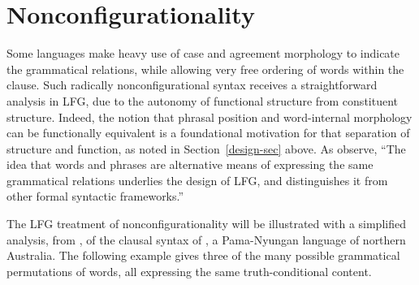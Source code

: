 %

\section{Nonconfigurationality}
\label{nonconfig-sec}
Some languages make heavy use of case and agreement morphology to indicate the grammatical relations, while allowing very free ordering of words within the clause.  Such radically nonconfigurational syntax receives a straightforward analysis in LFG, due to the autonomy of functional structure from constituent structure.  Indeed, the notion that phrasal position and word-internal morphology can be functionally equivalent is a foundational motivation for that separation of structure and function, as noted in Section~\ref{design-sec} above.  As \citet[5]{BATW2016a} observe, ``The idea that words and phrases are alternative means of expressing the
same grammatical relations underlies the design of LFG, and distinguishes it from other formal syntactic frameworks.''  

The LFG treatment of nonconfigurationality will be illustrated with a simplified analysis, from \citet[352--353]{BATW2016a}, of the clausal syntax of , a Pama-Nyungan language of northern Australia.  The following example gives three of the many possible grammatical permutations of words, all expressing the same truth-conditional content.

